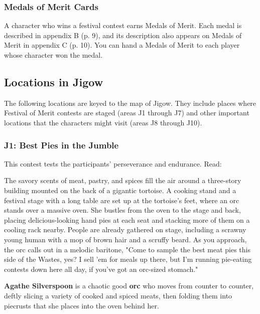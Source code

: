 \documentclass[a4paper, 11pt, bg=full, twocolumn, nooutline]{dndbook}
\begin{document}
\subsubsection{Medals of Merit Cards}

A character who wins a festival contest earns Medals of Merit. Each medal is described in appendix B (p. 9), and its description also appears on Medals of Merit in appendix C (p. 10). You can hand a Medals of Merit to each player whose character won the medal.

\subsection{Locations in Jigow}

The following locations are keyed to the map of Jigow. They include places where Festival of Merit contests are staged (areas J1 through J7) and other important locations that the characters might visit (areas J8 through J10).



\subsubsection{J1: Best Pies in the Jumble}

This contest tests the participants' perseverance and endurance. Read:

\begin{DndReadAloud}
The savory scents of meat, pastry, and spices fill the air around a three-story building mounted on the back of a gigantic tortoise. A cooking stand and a festival stage with a long table are set up at the tortoise's feet, where an orc stands over a massive oven. She bustles from the oven to the stage and back, placing delicious-looking hand pies at each seat and stacking more of them on a cooling rack nearby.
People are already gathered on stage, including a scrawny young human with a mop of brown hair and a scruffy beard. As you approach, the orc calls out in a melodic baritone, "Come to sample the best meat pies this side of the Wastes, yes? I sell 'em for meals up there, but I'm running pie-eating contests down here all day, if you've got an orc-sized stomach."
\end{DndReadAloud}

\textbf{Agathe Silverspoon} is a chaotic good \textbf{orc} who moves from counter to counter, deftly slicing a variety of cooked and spiced meats, then folding them into piecrusts that she places into the oven behind her.
\end{document}
